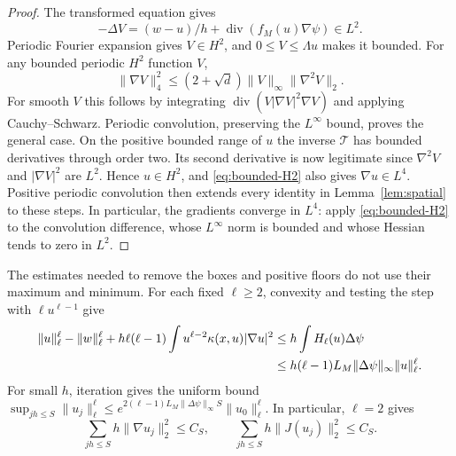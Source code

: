 \documentclass[11pt]{article}
\numberwithin{equation}{section}
\theoremstyle{definition}
\theoremstyle{remark}
\newcommand{\Div}{\operatorname{div}}
\newcommand{\norm}[1]{\lVert #1\rVert}
\begin{document}
\begin{proof}
The transformed equation gives
\[
 -\Delta V=(w-u)/h+\Div(f_M(u)\nabla\psi)\in L^2.
\]
Periodic Fourier expansion gives $V\in H^2$, and
$0\le V\le\Lambda u$ makes it bounded. For any bounded periodic $H^2$
function $V$,
\begin{equation}\label{eq:bounded-H2}
 \norm{\nabla V}_4^2
             \le(2+\sqrt d)\norm V_\infty\norm{\nabla^2V}_2.
\end{equation}
For smooth $V$ this follows by integrating
$\Div(V|\nabla V|^2\nabla V)$ and applying Cauchy--Schwarz.
Periodic convolution, preserving the $L^\infty$ bound, proves the general
case. On the positive bounded range of $u$ the inverse $\mathcal T$ has
bounded derivatives through order two. Its second derivative is now
legitimate since $\nabla^2V$ and $|\nabla V|^2$ are $L^2$.
Hence $u\in H^2$, and \eqref{eq:bounded-H2} also gives $\nabla u\in L^4$.
Positive periodic convolution then extends every identity in
Lemma~\ref{lem:spatial} to these steps. In particular, the gradients converge
in $L^4$: apply \eqref{eq:bounded-H2} to the convolution difference, whose
$L^\infty$ norm is bounded and whose Hessian tends to zero in $L^2$.
\end{proof}

The estimates needed to remove the boxes and positive floors do not use
their maximum and minimum. For each fixed $\ell\ge2$, convexity and
testing the step with $\ell u^{\ell-1}$ give
\begin{align}\label{eq:discrete-Lp}
 \norm u_\ell^\ell-\norm w_\ell^\ell
  +h\ell(\ell-1)\int u^{\ell-2}\kappa(x,u)|\nabla u|^2
 &\le h\int H_\ell(u)\Delta\psi\notag\\
 &\le h(\ell-1)L_M\norm{\Delta\psi}_\infty\norm u_\ell^\ell.
\end{align}
For small $h$, iteration gives the uniform bound
$\sup_{jh\le S}\norm{u_j}_\ell^\ell\le
e^{2(\ell-1)L_M\norm{\Delta\psi}_\infty S}\norm{u_0}_\ell^\ell$.
In particular, $\ell=2$ gives
\begin{equation}\label{eq:discrete-flux-bound}
 \sum_{jh\le S}h\norm{\nabla u_j}_2^2\le C_S,
 \qquad \sum_{jh\le S}h\norm{J(u_j)}_2^2\le C_S.
\end{equation}
\end{document}
